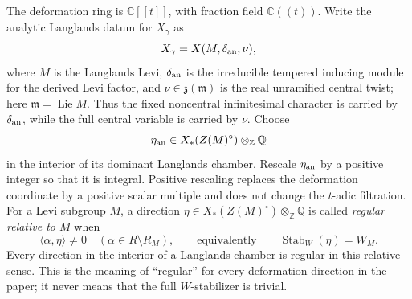 \documentclass[11pt]{amsart}
\theoremstyle{definition}
\theoremstyle{remark}
\begin{document}
The deformation ring is $\mathbb C[[t]]$, with fraction field
$\mathbb C((t))$.  Write the analytic Langlands datum for $X_\gamma$ as
\[
 X_\gamma=X(M,\delta_{\rm an},\nu),
\]
where $M$ is the Langlands Levi, $\delta_{\rm an}$ is the irreducible
tempered inducing
module for the derived Levi factor, and
$\nu\in\mathfrak z(\mathfrak m)$ is the real unramified central twist; here
$\mathfrak m=\operatorname{Lie}M$.  Thus the fixed noncentral infinitesimal
character is carried by $\delta_{\rm an}$, while the full central variable is
carried by $\nu$.  Choose
\[
 \eta_{\rm an}\in X_*(Z(M)^\circ)\otimes_{\mathbb Z}\mathbb Q
\]
in the interior of its dominant Langlands chamber.  Rescale $\eta_{\rm an}$ by a
positive integer so that it is integral.  Positive rescaling replaces the deformation coordinate
by a positive scalar multiple and does not change the $t$-adic filtration.
For a Levi subgroup $M$, a direction
$\eta\in X_*(Z(M)^\circ)\otimes_{\mathbb Z}\mathbb Q$ is called
\emph{regular relative to $M$} when
\[
 \langle\alpha,\eta\rangle\ne0\quad(\alpha\in R\setminus R_M),
 \qquad\text{equivalently}\qquad
 \operatorname{Stab}_W(\eta)=W_M.
\]
Every direction in the interior of a Langlands chamber is regular in this
relative sense.  This is the meaning of ``regular'' for every deformation
direction in the paper; it never means that the full $W$-stabilizer is
trivial.
\end{document}
